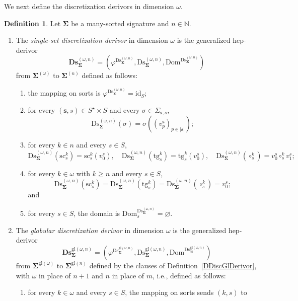 \documentclass[a4paper, reqno
]{amsart}
\newcommand{\bb}[1]{\ensuremath{\lvert #1 \rvert}}
\newcommand{\sig}[1]{\mathbf{#1}}             %
\newcommand{\Dom}{\mathrm{Dom}}
\newcommand{\id}{\mathrm{id}}
\newcommand{\gl}{\mathrm{gl}}                %
\newcommand{\src}{\mathrm{sc}}
\newcommand{\tgt}{\mathrm{tg}}
\newcommand{\Ds}{\mathrm{Ds}}
\newcommand{\bDs}{\mathbf{Ds}}
\theoremstyle{plain}
\theoremstyle{definition}
\newtheorem{definition}[theorem]{Definition}
\begin{document}
We next define the discretization derivors in dimension $\omega$.

\begin{definition}\label{DDiscOmegaDerivor}
Let $\sig{\Sigma}$ be a many-sorted signature and $n\in\mathbb{N}$.
\begin{enumerate}
\item The \emph{single-set discretization derivor} in dimension $\omega$ is the generalized hep-derivor
$$
\bDs^{(\omega,n)}_{\sig{\Sigma}}=\left(\varphi^{\Ds^{(\omega,n)}_{\sig{\Sigma}}},\Ds^{(\omega,n)}_{\sig{\Sigma}},\Dom^{\Ds^{(\omega,n)}_{\sig{\Sigma}}}\right)
$$
from $\sig{\Sigma}^{(\omega)}$ to $\sig{\Sigma}^{(n)}$ defined as follows:
\begin{enumerate}
\item the mapping on sorts is $\varphi^{\Ds^{(\omega,n)}_{\sig{\Sigma}}}=\id_{S}$;
\item for every $(\mathbf{s},s)\in S^{\star}\times S$ and every $\sigma\in\Sigma_{\mathbf{s},s}$,
$$
\Ds^{(\omega,n)}_{\sig{\Sigma}}(\sigma)=\sigma((v^{\mathbf{s}}_{p})_{p\in\bb{\mathbf{s}}});
$$
\item for every $k\in n$ and every $s\in S$,
$$
\Ds^{(\omega,n)}_{\sig{\Sigma}}(\src^{k}_{s})=\src^{k}_{s}(v^{s}_{0}),\quad
\Ds^{(\omega,n)}_{\sig{\Sigma}}(\tgt^{k}_{s})=\tgt^{k}_{s}(v^{s}_{0}),\quad
\Ds^{(\omega,n)}_{\sig{\Sigma}}(\circ^{k}_{s})=v^{s}_{0}\circ^{k}_{s}v^{s}_{1};
$$
\item for every $k\in\omega$ with $k\geq n$ and every $s\in S$,
$$
\Ds^{(\omega,n)}_{\sig{\Sigma}}(\src^{k}_{s})=\Ds^{(\omega,n)}_{\sig{\Sigma}}(\tgt^{k}_{s})=\Ds^{(\omega,n)}_{\sig{\Sigma}}(\circ^{k}_{s})=v^{s}_{0};
$$
and
\item for every $s\in S$, the domain is $\Dom^{\Ds^{(\omega,n)}_{\sig{\Sigma}}}_{s}=\varnothing$.
\end{enumerate}
\item The \emph{globular discretization derivor} in dimension $\omega$ is the generalized hep-derivor
$$
\bDs^{\gl(\omega,n)}_{\sig{\Sigma}}=\left(\varphi^{\Ds^{\gl(\omega,n)}_{\sig{\Sigma}}},\Ds^{\gl(\omega,n)}_{\sig{\Sigma}},\Dom^{\Ds^{\gl(\omega,n)}_{\sig{\Sigma}}}\right)
$$
from $\sig{\Sigma}^{\gl(\omega)}$ to $\sig{\Sigma}^{\gl(n)}$ defined by the clauses of Definition~\ref{DDiscGlDerivor}, with $\omega$ in place of $n+1$ and $n$ in place of $m$, i.e., defined as follows:
\begin{enumerate}
\item for every $k\in\omega$ and every $s\in S$, the mapping on sorts sends $(k,s)$ to

\end{enumerate}
\end{enumerate}
\end{definition}
\end{document}
